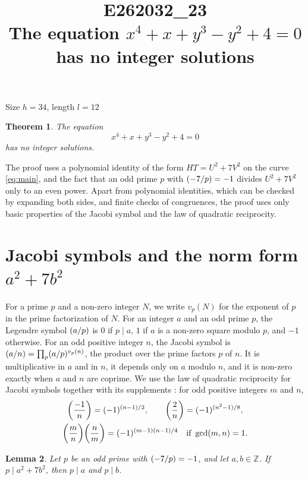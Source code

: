 \documentclass[11pt]{article}
\title{\textbf{E262032\_23}\\[4pt] {\Large The equation $x^{4}+x+y^{3}-y^{2}+4=0$ has no integer solutions}}
\author{}
\date{}
\newtheorem{theorem}{Theorem}
\newtheorem{lemma}[theorem]{Lemma}
\newcommand{\Z}{\mathbb{Z}}
\newcommand{\leg}[2]{\mathchoice{\biggl(\dfrac{#1}{#2}\biggr)}{(#1/#2)}{(#1/#2)}{(#1/#2)}}
\begin{document}
\maketitle
\vspace{-8ex}
\begin{center}
Size $h=34$, length $l=12$
\end{center}

\begin{theorem}\label{thm:main}
The equation
\begin{equation}\label{eq:main}
x^{4}+x+y^{3}-y^{2}+4=0
\end{equation}
has no integer solutions.
\end{theorem}

The proof uses a polynomial identity of the form $HT=U^2+7V^2$ on the curve \eqref{eq:main}, and the fact that an odd prime $p$ with $\leg{-7}{p}=-1$ divides $U^2+7V^2$ only to an even power. Apart from polynomial identities, which can be checked by expanding both sides, and finite checks of congruences, the proof uses only basic properties of the Jacobi symbol and the law of quadratic reciprocity.

\section{\texorpdfstring{Jacobi symbols and the norm form $a^2+7b^2$}{Jacobi symbols and the norm form}}

For a prime $p$ and a non-zero integer $N$, we write $v_p(N)$ for the exponent of $p$ in the prime factorization of $N$. For an integer $a$ and an odd prime $p$, the Legendre symbol $\leg{a}{p}$ is $0$ if $p\mid a$, $1$ if $a$ is a non-zero square modulo $p$, and $-1$ otherwise. For an odd positive integer $n$, the Jacobi symbol is $\leg{a}{n}=\prod_p\leg{a}{p}^{v_p(n)}$, the product over the prime factors $p$ of $n$. It is multiplicative in $a$ and in $n$, it depends only on $a$ modulo $n$, and it is non-zero exactly when $a$ and $n$ are coprime. We use the law of quadratic reciprocity for Jacobi symbols together with its supplements \cite[Chapter~5, \S2]{IR}: for odd positive integers $m$ and $n$,
\begin{gather*}
\leg{-1}{n}=(-1)^{(n-1)/2},\qquad\leg{2}{n}=(-1)^{(n^2-1)/8},\\
\leg{m}{n}\leg{n}{m}=(-1)^{(m-1)(n-1)/4}\quad\text{if }\gcd(m,n)=1.
\end{gather*}

\begin{lemma}\label{lem:divides}
Let $p$ be an odd prime with $\leg{-7}{p}=-1$, and let $a,b\in\Z$. If $p\mid a^2+7b^2$, then $p\mid a$ and $p\mid b$.
\end{lemma}
\end{document}
